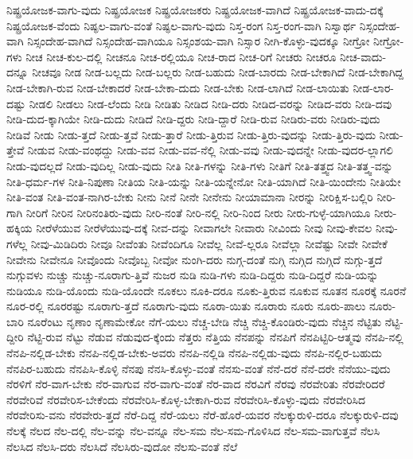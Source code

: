 {ನಿಷ್ಪ್ರಯೋಜಕ-ವಾಗು-ವುದು
ನಿಷ್ಪ್ರಯೋಜಕ
ನಿಷ್ಪ್ರಯೋಜಕರು
ನಿಷ್ಪ್ರಯೋಜಕ-ವಾಗಿದೆ
ನಿಷ್ಪ್ರಯೋಜಕ-ವಾದು-ದಕ್ಕೆ
ನಿಷ್ಪ್ರಯೋಜಕ-ವೆಂದು
ನಿಷ್ಫಲ-ವಾಗು-ವಂತೆ
ನಿಷ್ಫಲ-ವಾಗು-ವುದು
ನಿಸ್ತ-ರಂಗ
ನಿಸ್ತ-ರಂಗ-ವಾಗಿ
ನಿಸ್ವಾರ್ಥ
ನಿಸ್ಸಂದೇಹ-ವಾಗಿ
ನಿಸ್ಸಂದೇಹ-ವಾಗಿದೆ
ನಿಸ್ಸಂದೇಹ-ವಾಗಿಯೂ
ನಿಸ್ಸಂಶಯ-ವಾಗಿ
ನಿಸ್ಸಾರ
ನೀಗಿ-ಕೊಳ್ಳು-ವುದಕ್ಕೂ
ನೀಗ್ರೋ
ನೀಗ್ರೋ-ಗಳು
ನೀಚ
ನೀಚ-ಕುಲ-ದಲ್ಲಿ
ನೀಚನೂ
ನೀಚ-ರಲ್ಲಿಯೂ
ನೀಚ-ರಾದ
ನೀಚ-ರಿಗೆ
ನೀಚರು
ನೀಚರೂ
ನೀಚ-ವಾದು-ದನ್ನೂ
ನೀಚವೂ
ನೀಡ
ನೀಡ-ಬಲ್ಲದು
ನೀಡ-ಬಲ್ಲರು
ನೀಡ-ಬಹುದು
ನೀಡ-ಬಾರದು
ನೀಡ-ಬೇಕಾಗಿದೆ
ನೀಡ-ಬೇಕಾಗಿದ್ದ
ನೀಡ-ಬೇಕಾಗಿ-ರುವ
ನೀಡ-ಬೇಕಾದರೆ
ನೀಡ-ಬೇಕಾ-ದುದು
ನೀಡ-ಬೇಕು
ನೀಡ-ಲಾಗಿದೆ
ನೀಡ-ಲಾಯಿತು
ನೀಡ-ಲಾರ-ದಷ್ಟು
ನೀಡಲಿ
ನೀಡಲು
ನೀಡ-ಲೆಂದು
ನೀಡಿ
ನೀಡಿತು
ನೀಡಿದ
ನೀಡಿ-ದರು
ನೀಡಿದ-ವರನ್ನು
ನೀಡಿದ-ವರು
ನೀಡಿ-ದವು
ನೀಡಿ-ದುದ-ಕ್ಕಾಗಿಯೇ
ನೀಡಿ-ದುದು
ನೀಡಿದೆ
ನೀಡಿ-ದ್ದರು
ನೀಡಿ-ದ್ದಾರೆ
ನೀಡಿ-ರುವ
ನೀಡಿರು-ವರು
ನೀಡಿರು-ವುದು
ನೀಡಿವೆ
ನೀಡು
ನೀಡು-ತ್ತದೆ
ನೀಡು-ತ್ತವೆ
ನೀಡು-ತ್ತಾರೆ
ನೀಡು-ತ್ತಿರುವ
ನೀಡು-ತ್ತಿರು-ವುದನ್ನು
ನೀಡು-ತ್ತಿರು-ವುದು
ನೀಡು-ತ್ತೇವೆ
ನೀಡುವ
ನೀಡು-ವಂಥದ್ದು
ನೀಡು-ವವ
ನೀಡು-ವವ-ನೆಲ್ಲಿ
ನೀಡು-ವವು
ನೀಡು-ವುದನ್ನೇ
ನೀಡು-ವುದರ-ಲ್ಲಾಗಲಿ
ನೀಡು-ವುದಲ್ಲದೆ
ನೀಡು-ವುದಿಲ್ಲ
ನೀಡು-ವುದು
ನೀತಿ
ನೀತಿ-ಗಳನ್ನು
ನೀತಿ-ಗಳು
ನೀತಿಗೆ
ನೀತಿ-ತತ್ತ್ವದ
ನೀತಿ-ತತ್ತ್ವ-ವನ್ನು
ನೀತಿ-ಧರ್ಮ-ಗಳ
ನೀತಿ-ನಿಪುಣಾ
ನೀತಿಯ
ನೀತಿ-ಯನ್ನು
ನೀತಿ-ಯನ್ನೇನೋ
ನೀತಿ-ಯಾಗಿದೆ
ನೀತಿ-ಯಿಂದೇನು
ನೀತಿಯೇ
ನೀತಿ-ವಂತ
ನೀತಿ-ವಂತ-ನಾಗಿರ-ಬೇಕು
ನೀನು
ನೀನೆ
ನೀನೇ
ನೀನೇನು
ನೀಯಾಮಾನಾ
ನೀರನ್ನು
ನೀರಿಕ್ಷಿಸ-ಬಲ್ಲಿರಿ
ನೀರಿ-ಗಾಗಿ
ನೀರಿಗೆ
ನೀರಿನ
ನೀರಿನಂತಿರು-ವುದು
ನೀರಿ-ನಂತೆ
ನೀರಿ-ನಲ್ಲಿ
ನೀರಿ-ನಿಂದ
ನೀರು
ನೀರು-ಗುಳ್ಳೆ-ಯಾಗಿಯೂ
ನೀರು-ಹಕ್ಕಿಯ
ನೀರೆಳೆಯುವ
ನೀರೆಳೆಯುವು-ದಕ್ಕೆ
ನೀವ-ದನ್ನು
ನೀವಾಗಲೇ
ನೀವಾರು
ನೀವಿಂದು
ನೀವು
ನೀವು-ಕೇವಲ
ನೀವು-ಗಳೆಲ್ಲ
ನೀವು-ಮಿಡಿದಿರು
ನೀವೂ
ನೀವೆಂತು
ನೀವೆಂದಿಗೂ
ನೀವೆಲ್ಲ
ನೀವೆ-ಲ್ಲರೂ
ನೀವೆಲ್ಲಾ
ನೀವೆಷ್ಟು
ನೀವೇ
ನೀವೇಕೆ
ನೀವೇನು
ನೀವೇನೂ
ನೀವೊಂದು
ನೀವೊಬ್ಬ
ನೀವೋ
ನುಂಗಿ-ದರು
ನುಗ್ಗ-ದಂತೆ
ನುಗ್ಗಿ
ನುಗ್ಗಿದ
ನುಗ್ಗಿದೆ
ನುಗ್ಗು-ತ್ತದೆ
ನುಗ್ಗುವಳು
ನುಚ್ಚು
ನುಚ್ಚು-ನೂರಾಗು-ತ್ತಿವೆ
ನುಜರ
ನುಡಿ
ನುಡಿ-ಗಳು
ನುಡಿ-ದಿದ್ದರು
ನುಡಿ-ದಿದ್ದರೆ
ನುಡಿ-ಯನ್ನು
ನುಡಿಯೂ
ನುಡಿ-ಯೊಂದು
ನುಡಿ-ಯೊಂದೇ
ನೂಕಲು
ನೂಕಿ-ದರೂ
ನೂಕು-ತ್ತಿರುವ
ನೂಕುವ
ನೂತನ
ನೂರಕ್ಕೆ
ನೂರನೆ
ನೂರ-ರಲ್ಲಿ
ನೂರರಷ್ಟು
ನೂರಾಗು-ತ್ತದೆ
ನೂರಾಗು-ವುದು
ನೂರಾ-ಯಿತು
ನೂರಾರು
ನೂರು
ನೂರು-ಪಾಲು
ನೂರು-ಬಾರಿ
ನೂರೆಂಟು
ನೃಣಾಂ
ನೃಣಾಮೇಕೋ
ನೆಗೆ-ಯಲು
ನೆಚ್ಚ-ಬೇಡಿ
ನೆಚ್ಚಿ
ನೆಚ್ಚಿ-ಕೊಂಡಿರು-ವುದು
ನೆಚ್ಚಿನ
ನೆಟ್ಟಿತು
ನೆಟ್ಟಿ-ದ್ದೀರಿ
ನೆಟ್ಟಿ-ರುವ
ನೆಟ್ಟು
ನೆಡುವ
ನೆಡುವುದ-ಕ್ಕೆಂದು
ನೆತ್ತರು
ನೆತ್ತಿಯ
ನೆನಪನ್ನು
ನೆನಪಿಗೆ
ನೆನಪಿಟ್ಟಿರಿ-ಆತ್ಮವು
ನೆನಪಿ-ನಲ್ಲಿ
ನೆನಪಿ-ನಲ್ಲಿಡ-ಬೇಕು
ನೆನಪಿ-ನಲ್ಲಿಡ-ಬೇಕು-ಅವರು
ನೆನಪಿ-ನಲ್ಲಿಡಿ
ನೆನಪಿ-ನಲ್ಲಿಡು-ವುದು
ನೆನಪಿ-ನಲ್ಲಿರ-ಬಹುದು
ನೆನಪಿರ-ಬಹುದು
ನೆನಪಿಸಿ-ಕೊಳ್ಳಿ
ನೆನಪು
ನೆನಸಿ-ಕೊಳ್ಳು-ವಂತೆ
ನೆನಸು-ವಂತೆ
ನೆನೆ-ದರೆ
ನೆನೆ-ದರೇ
ನೆನೆಯು-ವುದು
ನೆರಳಿಗೆ
ನೆರ-ವಾಗ-ಬೇಕು
ನೆರ-ವಾಗುವ
ನೆರ-ವಾಗು-ವಂತೆ
ನೆರ-ವಾದ
ನೆರವಿಗೆ
ನೆರವು
ನೆರವೇರಿತು
ನೆರವೇರಿದರೆ
ನೆರವೇರಿವೆ
ನೆರವೇರಿಸ-ಬೇಕೆಂದು
ನೆರವೇರಿಸಿ-ಕೊಳ್ಳ-ಬೇಕಾಗಿ-ರುವ
ನೆರವೇರಿಸಿ-ಕೊಳ್ಳು-ವುದು
ನೆರವೇರಿಸಿದ
ನೆರವೇರಿಸು-ವನು
ನೆರವೇರು-ತ್ತದೆ
ನೆರೆ-ದಿದ್ದ
ನೆರೆ-ಯಲು
ನೆರೆ-ಹೊರೆ-ಯವರ
ನೆಲಕ್ಕುರುಳಿ-ದರೂ
ನೆಲಕ್ಕುರುಳಿ-ದವು
ನೆಲಕ್ಕೆ
ನೆಲದ
ನೆಲ-ದಲ್ಲಿ
ನೆಲ-ವನ್ನು
ನೆಲ-ವನ್ನೂ
ನೆಲ-ಸಮ
ನೆಲ-ಸಮ-ಗೊಳಿಸಿದ
ನೆಲ-ಸಮ-ವಾಗುತ್ತವೆ
ನೆಲಸಿ
ನೆಲಸಿದ
ನೆಲಸಿ-ದರು
ನೆಲಸಿದೆ
ನೆಲಸಿರು-ವುದೋ
ನೆಲಸು-ವಂತೆ
ನೆಲೆ
}
